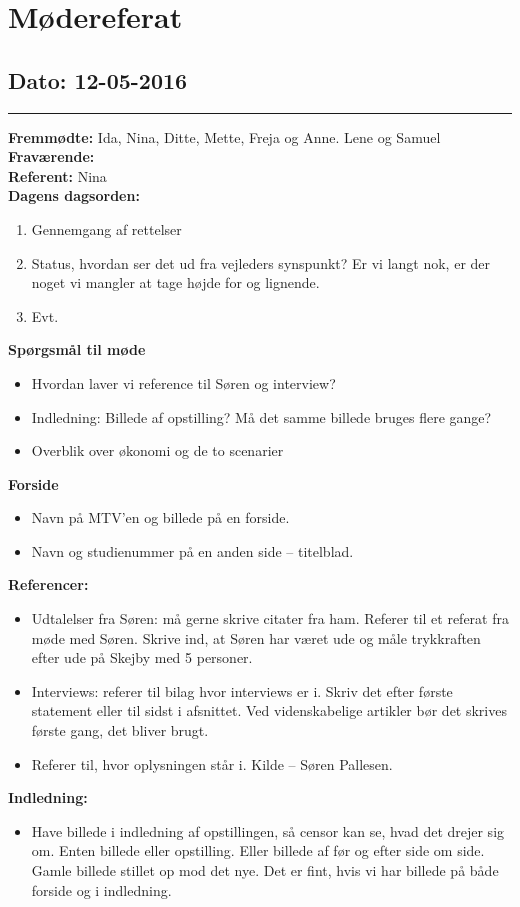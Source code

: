 \chapter{Mødereferat}

\section{Dato: 12-05-2016}
\hrule
\textbf{Fremmødte: } Ida, Nina, Ditte, Mette, Freja og Anne. Lene og Samuel \\
\textbf{Fraværende:} \\
\textbf{Referent: } Nina \\
\textbf{Dagens dagsorden: }
\begin{enumerate}
\item Gennemgang af rettelser
\item Status, hvordan ser det ud fra vejleders synspunkt? Er vi langt nok, er der noget vi mangler at tage højde for og lignende.
\item Evt.
\end{enumerate}
\textbf{Spørgsmål til møde}
\begin{itemize}
\item Hvordan laver vi reference til Søren og interview?
\item Indledning: Billede af opstilling? Må det samme billede bruges flere gange?
\item Overblik over økonomi og de to scenarier
\end{itemize}
\textbf{Forside}
\begin{itemize}
\item Navn på MTV'en og billede på en forside. 
\item Navn og studienummer på en anden side – titelblad. 
\end{itemize}
\textbf{Referencer: }
\begin{itemize}
\item Udtalelser fra Søren: må gerne skrive citater fra ham. Referer til et referat fra møde med Søren. Skrive ind, at Søren har været ude og måle trykkraften efter ude på Skejby med 5 personer. 
\item Interviews: referer til bilag hvor interviews er i. Skriv det efter første statement eller til sidst i afsnittet. Ved videnskabelige artikler bør det skrives første gang, det bliver brugt.  
\item Referer til, hvor oplysningen står i. Kilde – Søren Pallesen. 
\end{itemize}
\textbf{Indledning:}
\begin{itemize}
\item Have billede i indledning af opstillingen, så censor kan se, hvad det drejer sig om. Enten billede eller opstilling. Eller billede af før og efter side om side. Gamle billede stillet op mod det nye. Det er fint, hvis vi har billede på både forside og i indledning. 
\end{itemize}
